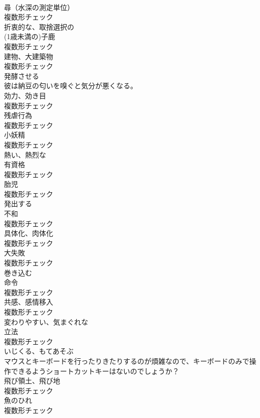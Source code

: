 \documentclass[8pt]{extreport}
\begin{document}
\begin{CJK}{UTF8}{min}
\\	[名詞]	尋（水深の測定単位）	
\\	複数形チェック
\\	[形容詞]	折衷的な、取捨選択の	
\\	[名詞]	(1歳未満の)子鹿	
\\	複数形チェック
\\	[名詞]	建物、大建築物	
\\	複数形チェック
\\	[動詞]	発酵させる	
\\	彼は納豆の匂いを嗅ぐと気分が悪くなる。	
\\	[名詞]	効力、効き目	
\\	複数形チェック
\\	[名詞]	残虐行為	
\\	複数形チェック
\\	[名詞]	小妖精	
\\	複数形チェック
\\	[形容詞]	熱い、熱烈な	
\\	[名詞]	有資格	
\\	複数形チェック
\\	[名詞]	胎児	
\\	複数形チェック
\\	[動詞]	発出する	
\\	[名詞]	不和	
\\	複数形チェック
\\	[名詞]	具体化、肉体化	
\\	複数形チェック
\\	[名詞]	大失敗	
\\	複数形チェック
\\	[動詞]	巻き込む	
\\	[名詞]	命令	
\\	複数形チェック
\\	[名詞]	共感、感情移入	
\\	複数形チェック
\\	[形容詞]	変わりやすい、気まぐれな	
\\	[名詞]	立法	
\\	複数形チェック
\\	[動詞]	いじくる、もてあそぶ	
\\	マウスとキーボードを行ったりきたりするのが煩雑なので、キーボードのみで操作できるようショートカットキーはないのでしょうか？	
\\	[名詞]	飛び領土、飛び地	
\\	複数形チェック
\\	[名詞]	魚のひれ	
\\	複数形チェック

\end{CJK}
\end{document}
